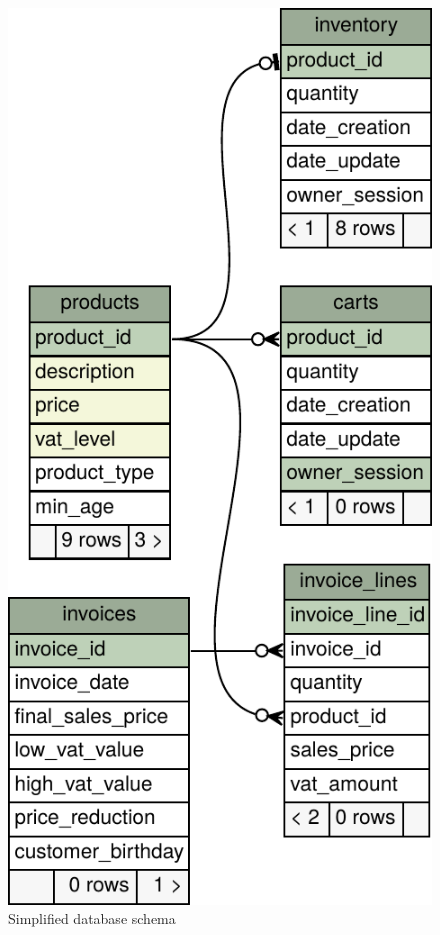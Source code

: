 \setlength{\intextsep}{0pt}
\begin{figure}\vspace{-2\baselineskip}  
  \includegraphics[width=\linewidth]{figures/simpleschema.pdf}
  \caption{\label{fig:dbschema}Simplified database schema}
  \vspace{2\baselineskip}  
\end{figure}%

